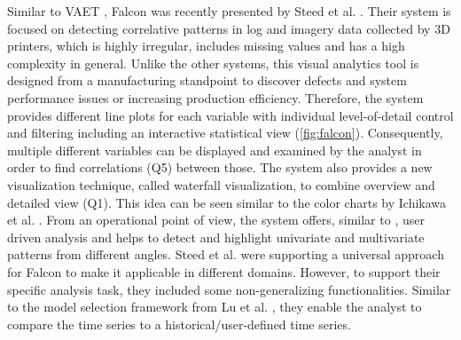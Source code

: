 \documentclass[electronic]{vgtc}             %
\begin{document}
Similar to VAET \cite{Xie:2014}, Falcon was recently presented by Steed et al. \cite{steed:2017}.
Their system is focused on detecting correlative patterns in log and imagery data collected by 3D printers, which is highly irregular, includes missing values and has a high complexity in general.
Unlike the other systems, this visual analytics tool is designed from a manufacturing standpoint to discover defects and system performance issues or increasing production efficiency.
Therefore, the system provides different line plots for each variable with individual level-of-detail control and filtering including an interactive statistical view (\autoref{fig:falcon}).
Consequently, multiple different variables can be displayed and examined by the analyst in order to find correlations (Q5) between those.
The system also provides a new visualization technique, called waterfall visualization, to combine overview and detailed view (Q1). 
This idea can be seen similar to the color charts by Ichikawa et al. \cite{ichikawa:2002}.
From an operational point of view, the system offers, similar to \cite{Xie:2014}, user driven analysis and helps to detect and highlight univariate and multivariate patterns from different angles.
Steed et al. were supporting a universal approach for Falcon to make it applicable in different domains. 
However, to support their specific analysis task, they included some non-generalizing functionalities. 
Similar to the model selection framework from Lu et al. \cite{Lu:2014}, they enable the analyst to compare the time series to a historical/user-defined time series. 
\end{document}
